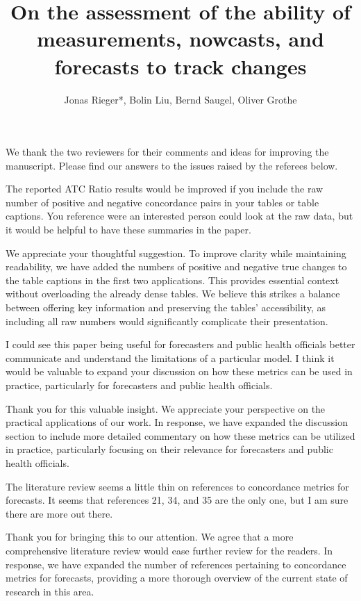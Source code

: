 \documentclass[12pt]{journalrebuttal}
\title{On the assessment of the ability of measurements, nowcasts, and forecasts to track changes}
\author{Jonas Rieger*, Bolin Liu, Bernd Saugel, Oliver Grothe}
\begin{document}
\maketitle

We thank the two reviewers for their comments and ideas for improving the manuscript. 
Please find our answers to the issues raised by the referees below.


\nextreviewer

\begin{revcomment}
	The reported ATC Ratio results would be improved if you include the raw number of positive and negative concordance pairs in your tables or table captions. You reference were an interested person could look at the raw data, but it would be helpful to have these summaries in the paper.
\end{revcomment}
\begin{response}
    We appreciate your thoughtful suggestion. To improve clarity while maintaining readability, we have added the numbers of positive and negative true changes to the table captions in the first two applications. This provides essential context without overloading the already dense tables. We believe this strikes a balance between offering key information and preserving the tables' accessibility, as including all raw numbers would significantly complicate their presentation.
\end{response}

\begin{revcomment}
I could see this paper being useful for forecasters and public health officials better communicate and understand the limitations of a particular model. I think it would be valuable to expand your discussion on how these metrics can be used in practice, particularly for forecasters and public health officials.
\end{revcomment}
\begin{response}
    Thank you for this valuable insight. We appreciate your perspective on the practical applications of our work. In response, we have expanded the discussion section to include more detailed commentary on how these metrics can be utilized in practice, particularly focusing on their relevance for forecasters and public health officials.
\end{response}

\begin{revcomment}
The literature review seems a little thin on references to concordance metrics for forecasts. It seems that references 21, 34, and 35 are the only one, but I am sure there are more out there.
\end{revcomment}
\begin{response}
    Thank you for bringing this to our attention. We agree that a more comprehensive literature review would ease further review for the readers. In response, we have expanded the number of references pertaining to concordance metrics for forecasts, providing a more thorough overview of the current state of research in this area.
\end{response}
\end{document}
